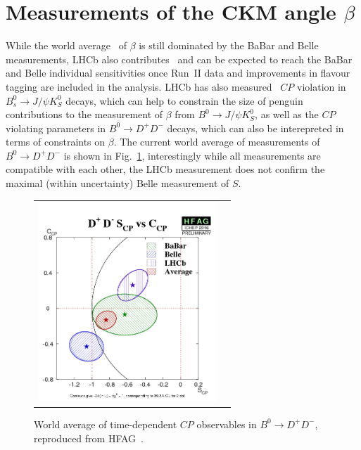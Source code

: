 \section{Measurements of the CKM angle $\beta$}
\label{sec:beta}

While the world average~\cite{HFAG} of $\beta$ is still dominated
by the BaBar and Belle measurements, LHCb also contributes~\cite{} and can be expected
to reach the BaBar and Belle individual sensitivities once Run~II data and
improvements in flavour tagging are included in the analysis. LHCb has also measured~\cite{}
$CP$ violation in $B^0_s \to J/\psi K^0_S$ decays,
which can help to constrain the size of penguin contributions to the measurement
of $\beta$ from $B^0 \to J/\psi K^0_S$, as well as the $CP$ violating parameters in
$B^0 \to D^+ D^-$ decays, which can also be interepreted in terms of constraints on $\beta$.
The current world average of measurements of $B^0 \to D^+ D^-$ is shown in Fig.~\ref{b2ddwa}, 
interestingly while all measurements are compatible with each other, the LHCb measurement
does not confirm the maximal (within uncertainty) Belle measurement of $S$.

\begin{figure}
  \begin{center}
    \begin{tabular}{c c}
      \includegraphics[height=7.5cm]{figs/D+D-S_CPvsC_CP.png} &
    \end{tabular}
  \end{center}
  \vspace{-0.5cm}
  \caption{\label{b2ddwa}World average of time-dependent $CP$ observables in $B^0 \to D^+ D^-$, reproduced from HFAG~\cite{HFAG}.}
\end{figure}

